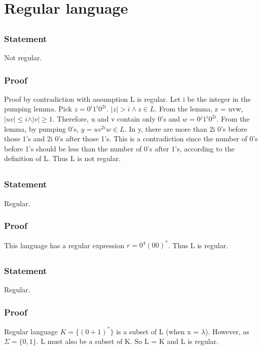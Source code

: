 \documentclass{article}
\begin{document}
\section{Regular language}
\subsection{}
\subsubsection{Statement}
Not regular.
\subsubsection{Proof}
Proof by contradiction with assumption L is regular. Let i be the integer in the
pumping lemma. Pick $z = 0^i1^i0^{2i}$. $\vert z \vert > i \land z \in L$. From
the lemma, z = uvw, $\vert uv \vert \leq i \land \vert v \vert \geq 1$.
Therefore, u and v contain only 0's and $w = 0^j1^i0^{2i}$. From
the lemma, by pumping 0's, $y = uv^{2i}w \in L$. In y, there are more than 2i
0's before those 1's and 2i 0's after those 1's. This is a contradiction since the number
of 0's before 1's should be less than the number of 0's after 1's, according to
the definition of L.
Thus L is not regular.
\subsection{}
\subsubsection{Statement}
Regular.
\subsubsection{Proof}
This language has a regular expression $r = 0^4(00)^*$.
Thus L is regular.
\subsection{}
\subsubsection{Statement}
Regular.
\subsubsection{Proof}
Regular language $K = \{(0+1)^*\} $ is a subset of L (when x = $\lambda$).
However, as $\Sigma = \{0, 1\}$. L must also be a subset of K.
So L = K and L is regular.
\end{document}
